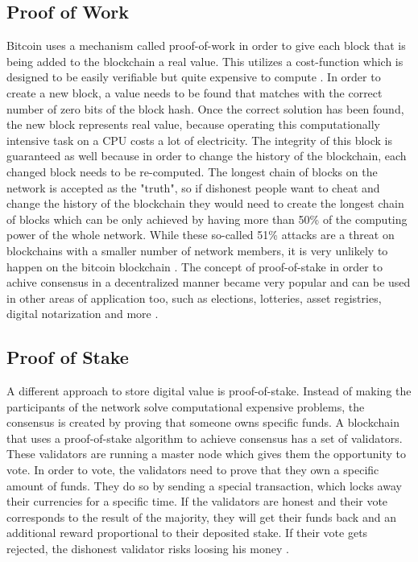 \subsection{Proof of Work}
Bitcoin uses a mechanism called proof-of-work in order to give each block that is being added to the blockchain a real value. This utilizes a cost-function which is designed to be easily verifiable but quite expensive to compute \cite{Back2002}. In order to create a new block, a value needs to be found that matches with the correct number of zero bits of the block hash. Once the correct solution has been found, the new block represents real value, because operating this computationally intensive task on a CPU costs a lot of electricity. The integrity of this block is guaranteed as well because in order to change the history of the blockchain, each changed block needs to be re-computed. The longest chain of blocks on the network is accepted as the "truth", so if dishonest people want to cheat and change the history of the blockchain they would need to create the longest chain of blocks which can be only achieved by having more than 50\% of the computing power of the whole network. While these so-called 51\% attacks are a threat on blockchains with a smaller number of network members, it is very unlikely to happen on the bitcoin blockchain \cite{Swan2015}. The concept of proof-of-stake in order to achive consensus in a decentralized manner became very popular and can be used in other areas of application too, such as elections, lotteries, asset registries, digital notarization and more \cite{Antonopoulos2017}.

\subsection{Proof of Stake}
A different approach to store digital value is proof-of-stake. Instead of making the participants of the network solve computational expensive problems, the consensus is created by proving that someone owns specific funds. A blockchain that uses a proof-of-stake algorithm to achieve consensus has a set of validators. These validators are running a master node which gives them the opportunity to vote. In order to vote, the validators need to prove that they own a specific amount of funds. They do so by sending a special transaction, which locks away their currencies for a specific time. If the validators are honest and their vote corresponds to the result of the majority, they will get their funds back and an additional reward proportional to their deposited stake. If their vote gets rejected, the dishonest validator risks loosing his money \cite{AntonopoulosWood2018}.

